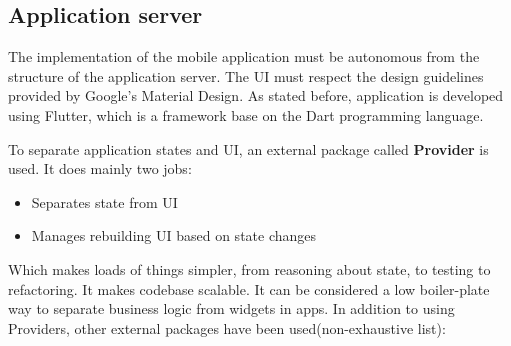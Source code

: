\subsection{Application server}
The implementation of the mobile application must be autonomous from the structure of the application server. The UI must respect the design guidelines provided by Google's Material Design.
As stated before, application is developed using Flutter, which is a framework base on the Dart programming language.

To separate application states and UI, an external package called \textbf{Provider} is used.
It does mainly two jobs:
\begin{itemize}
    \item Separates state from UI
    \item Manages rebuilding UI based on state changes
\end{itemize}
Which makes loads of things simpler, from reasoning about state, to testing to refactoring. It makes codebase scalable.
It can be considered a low boiler-plate way to separate business logic from  widgets in apps.
In addition to using Providers, other external packages have been used(non-exhaustive list):
